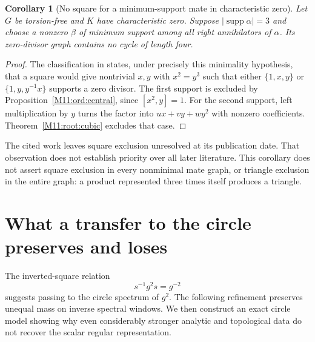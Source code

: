 \documentclass[11pt,a4paper,oneside]{report}
\newtheorem{corollary}[theorem]{Corollary}
\theoremstyle{definition}
\theoremstyle{remark}
\DeclareMathOperator{\supp}{supp}
\begin{document}
\begin{corollary}[No square for a minimum-support mate in characteristic zero]
\label{M11:ord:square}
Let $G$ be torsion-free and $K$ have characteristic zero.
Suppose $|\supp\alpha|=3$ and choose a nonzero $\beta$ of minimum
support among all right annihilators of $\alpha$. Its zero-divisor
graph contains no cycle of length four.
\end{corollary}
\begin{proof}
The classification in \cite[Theorem 3.25]{B:ATsmall} states, under precisely
this minimality hypothesis, that a square would give nontrivial
$x,y$ with $x^2=y^3$ such that either $\{1,x,y\}$ or
$\{1,y,y^{-1}x\}$ supports a zero divisor. The first support is
excluded by Proposition~\ref{M11:ord:central}, since $[x^2,y]=1$.
For the second support, left multiplication by $y$ turns the factor
into $ux+vy+wy^2$ with nonzero coefficients. Theorem~\ref{M11:root:cubic}
excludes that case.
\end{proof}
The cited work leaves square exclusion unresolved at its publication
date. That observation does not establish priority over all later
literature. This corollary does not assert square exclusion in every
nonminimal mate graph, or triangle exclusion in the entire graph:
a product represented three times itself produces a triangle.

\section{What a transfer to the circle preserves and loses}\label{M11:circle:section}
The inverted-square relation
\[
s^{-1}g^2s=g^{-2}
\]
suggests passing to the circle spectrum of $g^2$. The following
refinement preserves unequal mass on inverse spectral windows.
We then construct an exact circle model showing why even considerably
stronger analytic and topological data do not recover the scalar
regular representation.
\end{document}
